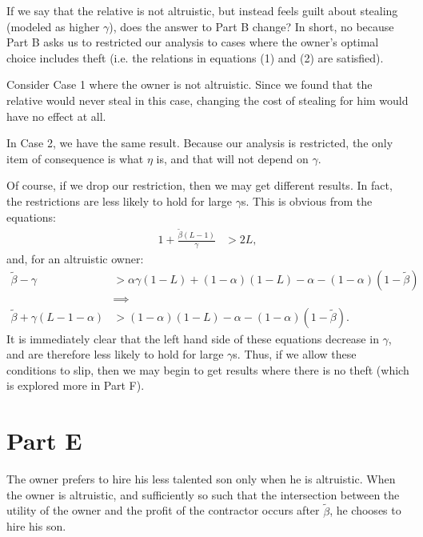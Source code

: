 \documentclass[12pt]{paper}
\begin{document}
If we say that the relative is not altruistic, but instead feels guilt about stealing (modeled as higher $\gamma$), does the answer to Part B change? In short, no because Part B asks us to restricted our analysis to cases where the owner's optimal choice includes theft (i.e. the relations in equations (1) and (2) are satisfied).

Consider Case 1 where the owner is not altruistic. Since we found that the relative would never steal in this case, changing the cost of stealing for him would have no effect at all.

In Case 2, we have the same result. Because our analysis is restricted, the only item of consequence is what $\eta$ is, and that will not depend on $\gamma$. 

Of course, if we drop our restriction, then we may get different results. In fact, the restrictions are less likely to hold for large $\gamma$s. This is obvious from the equations:
\begin{align*}
1+\frac{\tilde{\beta}(L-1)}{\gamma} &>2L,
\end{align*}
and, for an altruistic owner:
\begin{align*}
\tilde{\beta}-\gamma&>\alpha \gamma(1-L)+(1-\alpha)(1-L)-\alpha-(1-\alpha)(1-\tilde{\beta})\\
&\implies\\
\tilde{\beta}+\gamma(L-1-\alpha)&>(1-\alpha)(1-L)-\alpha-(1-\alpha)(1-\tilde{\beta}).
\end{align*}
It is immediately clear that the left hand side of these equations decrease in $\gamma$, and are therefore less likely to hold for large $\gamma$s. Thus, if we allow these conditions to slip, then we may begin to get results where there is no theft (which is explored more in Part F).

\section{Part E}

The owner prefers to hire his less talented son only when he is
altruistic. When the owner is altruistic, and sufficiently so such
that the intersection between the utility of the owner and the profit
of the contractor occurs after $\tilde{\beta}$, he chooses to hire his
son.
\end{document}
